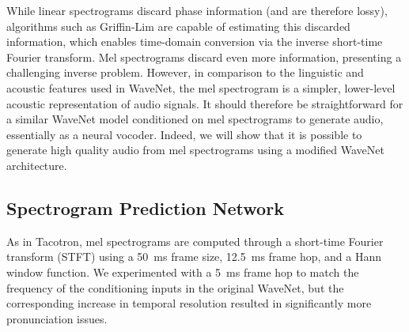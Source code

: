 While linear spectrograms discard phase information (and are therefore lossy),
algorithms such as Griffin-Lim \cite{Griffin84signalestimation} are capable of
estimating this discarded information, which enables time-domain conversion
via the inverse short-time Fourier transform. Mel spectrograms discard even more
information, presenting a challenging inverse problem.
%
However, in comparison to the linguistic and acoustic features used in
WaveNet, the mel spectrogram is a simpler, lower-level acoustic
representation of audio signals. It should therefore be straightforward for a
similar WaveNet model conditioned on mel spectrograms to generate audio,
essentially as a neural vocoder.
%
%
Indeed, we will show that it is possible to generate high quality audio from mel
spectrograms using a modified WaveNet architecture.


\subsection{Spectrogram Prediction Network}
\label{ssec:c2f}


%
As in Tacotron, mel spectrograms are computed
through a short-time Fourier transform (STFT) using a 50~ms frame size, 12.5~ms
frame hop, and a Hann window function. We experimented with a 5~ms frame hop to
match the frequency of the conditioning inputs in the original WaveNet, but
the corresponding increase in temporal resolution resulted in significantly more
pronunciation issues.

